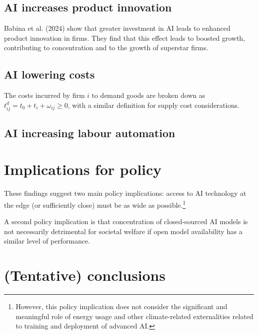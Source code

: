 \documentclass[
]{article}
\theoremstyle{plain}
\theoremstyle{definition}
\theoremstyle{remark}
\begin{document}
\subsection{AI increases product
innovation}\label{ai-increases-product-innovation}

Babina et al. (2024) show that greater investment in AI leads to
enhanced product innovation in firms. They find that this effect leads
to boosted growth, contributing to concentration and to the growth of
superstar firms.

\subsection{AI lowering costs}\label{ai-lowering-costs}

The costs incurred by firm \(i\) to demand goods are broken down as
\(t_{ij}^d = t_0 + t_i + \omega_{ij} \geq 0\), with a similar definition
for supply cost considerations.

\subsection{AI increasing labour
automation}\label{ai-increasing-labour-automation}

\section{Implications for policy}\label{implications-for-policy}

These findings suggest two main policy implications: access to AI
technology at the edge (or sufficiently close) must be as wide as
possible.\footnote{However, this policy implication does not consider
  the significant and meaningful role of energy usage and other
  climate-related externalities related to training and deployment of
  advanced AI.}

A second policy implication is that concentration of closed-sourced AI
models is not necessarily detrimental for societal welfare if open model
availability has a similar level of performance.

\section{(Tentative) conclusions}\label{tentative-conclusions}
\end{document}
